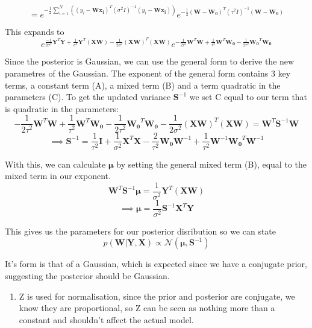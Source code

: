 \documentclass[11pt]{article}
\providecommand{\tightlist}{%
      \setlength{\itemsep}{0pt}\setlength{\parskip}{0pt}}
\begin{document}
\[ = e^{-\frac{1}{2}\sum^N_{i=1}((y_i - \boldsymbol{W} \boldsymbol{x_i})^T(\sigma^2 I)^{-1}(y_i - \boldsymbol{W} \boldsymbol{x_i}))} e^{-\frac{1}{2}(\boldsymbol{W} - \boldsymbol{W_0})^T(\tau^2 I)^{-1}(\boldsymbol{W}-\boldsymbol{W_0})} \]

This expands to
\[ e^{\frac{-1}{2 \sigma^2}\boldsymbol{Y}^T \boldsymbol{Y} + \frac{1}{\sigma^2} \boldsymbol{Y}^T (\boldsymbol{X W}) - \frac{1}{2 \sigma^2}(\boldsymbol{X W})^T (\boldsymbol{X W})} e^{-\frac{1}{2\tau^2}\boldsymbol{W}^T\boldsymbol{W} + \frac{1}{\tau^2}\boldsymbol{W}^T\boldsymbol{W_0} - \frac{1}{2\tau^2}\boldsymbol{W_0}^T\boldsymbol{W_0}} \]

Since the posterior is Gaussian, we can use the general form to derive
the new parametres of the Gaussian. The exponent of the general form
contains 3 key terms, a constant term (A), a mixed term (B) and a term
quadratic in the parameters (C). To get the updated variance
\(\boldsymbol{S}^{-1}\) we set C equal to our term that is quadratic in
the parameters:
\[ -\frac{1}{2 \tau^2}\boldsymbol{W}^T\boldsymbol{W} + \frac{1}{\tau^2}\boldsymbol{W}^T\boldsymbol{W_0} - \frac{1}{2\tau^2}\boldsymbol{W_0}^T\boldsymbol{W_0} - \frac{1}{2\sigma^2}(\boldsymbol{XW})^T(\boldsymbol{XW}) = \boldsymbol{W}^T\boldsymbol{S}^{-1}\boldsymbol{W}\]
\[\implies \boldsymbol{S}^{-1} = \frac{1}{\tau^2}\boldsymbol{I} + \frac{1}{\sigma^2}\boldsymbol{X}^T\boldsymbol{X} -\frac{2}{\tau^2} \boldsymbol{W_0}\boldsymbol{W}^{-1} + \frac{1}{\tau^2}\boldsymbol{W}^{-1}\boldsymbol{W_0}^T\boldsymbol{W}^{-1}\]

With this, we can calculate \(\boldsymbol{\mu}\) by setting the general
mixed term (B), equal to the mixed term in our exponent.
\[\boldsymbol{W}^T\boldsymbol{S}^{-1}\boldsymbol{\mu} = \frac{1}{\sigma^2}\boldsymbol{Y}^T(\boldsymbol{XW})\]
\[\implies \boldsymbol{\mu} = \frac{1}{\sigma^2}\boldsymbol{S}^{-1}\boldsymbol{X}^T\boldsymbol{Y}\]

This gives us the parameters for our posterior disribution so we can
state
\[p(\boldsymbol{W}|\boldsymbol{Y}, \boldsymbol{X}) \propto \mathcal{N}(\boldsymbol{\mu},\boldsymbol{S}^{-1}) \]

It's form is that of a Gaussian, which is expected since we have a
conjugate prior, suggesting the posterior should be Gaussian.

\begin{enumerate}
\def\labelenumi{\alph{enumi})}
\setcounter{enumi}{2}
\tightlist
\item
  Z is used for normalisation, since the prior and posterior are
  conjugate, we know they are proportional, so Z can be seen as nothing
  more than a constant and shouldn't affect the actual model.
\end{enumerate}
\end{document}
